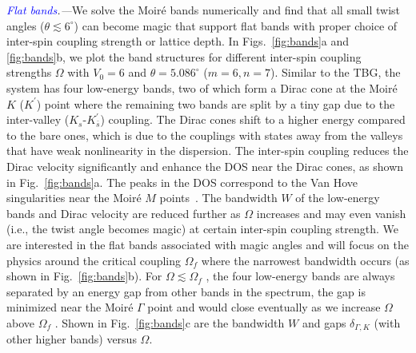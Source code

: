 \documentclass[twocolumn,english,prl,floatfix,citeautoscript,nofootinbib]{revtex4}
\begin{document}
\emph{\textcolor{blue}{Flat bands}.---}We solve the Moir\'{e} bands
numerically and find that all small twist angles ($\theta \lesssim 6^{\circ }
$) can become magic that support flat bands with proper choice of inter-spin
coupling strength or lattice depth. %
In Figs.~\ref{fig:bands}a and \ref{fig:bands}b, we plot the band structures
for different inter-spin coupling strengths $\Omega $ with $V_{0}=6$ and $%
\theta =5.086^{\circ }$ ($m=6,n=7$). Similar to the TBG, the system has four
low-energy bands, two of which form a Dirac cone at the Moir\'{e} $K$ ($%
K^{\prime }$) point where the remaining two bands are split by a tiny gap
due to the inter-valley ($K_{s}$-$K_{\bar{s}}^{\prime }$) coupling. The
Dirac cones shift to a higher energy compared to the bare ones, which is due
to the couplings with states away from the valleys that have weak
nonlinearity in the dispersion.
The inter-spin coupling reduces the Dirac velocity significantly and enhance
the DOS near the Dirac cones, as shown in Fig.~\ref{fig:bands}a. The peaks
in the DOS correspond to the Van Hove singularities near the Moir\'{e} $M$
points~\cite{PhysRevLett.122.026801,Nat.Commun.10.5769}.
The bandwidth $W$ of the low-energy bands and Dirac velocity are reduced
further as $\Omega $ increases and may even vanish (i.e., the twist angle
becomes magic) at certain inter-spin coupling strength. We are interested in
the flat bands associated with magic angles and will focus on the physics
around the critical coupling $\Omega _{f}$ where the narrowest bandwidth
occurs (as shown in Fig.~\ref{fig:bands}b). For $\Omega \lesssim \Omega _{f}$%
, the four low-energy bands are always separated by an energy gap from other
bands in the spectrum, the gap is minimized near the Moir\'{e} $\Gamma $
point and would close eventually as we increase $\Omega $ above $\Omega _{f}$%
. Shown in Fig.~\ref{fig:bands}c are the bandwidth $W$ and gaps $\delta
_{\Gamma ,K}$ (with other higher bands) versus %
$\Omega $. %
\end{document}
